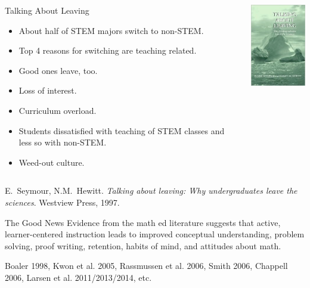 \documentclass[10pt,handout]{beamer}
\begin{document}
\begin{frame}

\begin{columns}[c]
\begin{block}{Talking About Leaving}
\begin{itemize}
\item About half of STEM majors switch to non-STEM.
\item Top 4 reasons for switching are teaching related.
\item Good ones leave, too.
\item Loss of interest.
\item Curriculum overload.
\item Students dissatisfied with teaching of STEM classes and less so with non-STEM.
\item Weed-out culture.
\end{itemize}
\end{block}
\begin{center}
\includegraphics[width=1.25in]{TalkingAboutLeaving.png}
\end{center}
\end{columns}

\vspace{1em}

E.~Seymour, N.M.~Hewitt. \emph{Talking about leaving: Why undergraduates leave the sciences}. Westview Press, 1997.

\end{frame}


\begin{frame}

\begin{block}{The Good News}
Evidence from the math ed literature suggests that active, learner-centered instruction leads to improved conceptual understanding, problem solving, proof writing, retention, habits of mind, and attitudes about math.

\vspace{1em}

Boaler 1998, Kwon et al. 2005, Rassmussen et al. 2006, Smith 2006, Chappell 2006, Larsen et al. 2011/2013/2014, etc.

\end{block}

\end{frame}
\end{document}
